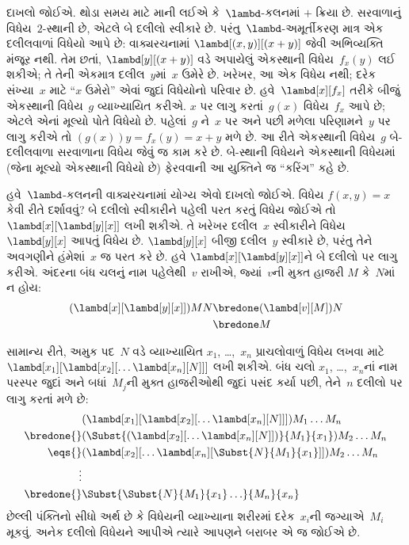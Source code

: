 દાખલો જોઈએ. થોડા સમય માટે માની લઈએ કે~$\lambd$-કલનમાં
$+$ ક્રિયા છે. સરવાળાનું વિધેય~$2$-સ્થાની છે, એટલે બે દલીલો
સ્વીકારે છે. પરંતુ~$\lambd$-અમૂર્તીકરણ માત્ર એક દલીલવાળાં વિધેયો
આપે છે: વાક્યરચનામાં $\lambd[(x,y)][(x+y)]$ જેવી અભિવ્યક્તિ
મંજૂર નથી. તેમ છતાં, $\lambd[y][(x+y)]$ વડે અપાયેલું એકસ્થાની
વિધેય~$f_x(y)$ લઈ શકીએ; તે તેની એકમાત્ર દલીલ~$y$માં~$x$ ઉમેરે
છે. ખરેખર, આ એક વિધેય નથી; દરેક સંખ્યા~$x$ માટે ``$x$ ઉમેરો''
એવાં જુદાં વિધેયોનો પરિવાર છે. હવે~$\lambd[x][f_x]$ તરીકે બીજું
એકસ્થાની વિધેય~$g$ વ્યાખ્યાયિત કરીએ. $x$ પર લાગુ કરતાં~$g(x)$
વિધેય~$f_x$ આપે છે; એટલે એનાં મૂલ્યો પોતે વિધેયો છે. પહેલાં~$g$
ને~$x$ પર અને પછી મળેલા પરિણામને~$y$ પર લાગુ કરીએ તો
$(g(x))y = f_x(y) = x+y$ મળે છે. આ રીતે એકસ્થાની વિધેય~$g$
બે-દલીલવાળા સરવાળાના વિધેય જેવું જ કામ કરે છે. બે-સ્થાની વિધેયને
એકસ્થાની વિધેયમાં (જેના મૂલ્યો એકસ્થાની વિધેયો છે) ફેરવવાની
આ યુક્તિને જ ``કરિંગ'' કહે છે.

હવે~$\lambd$-કલનની વાક્યરચનામાં યોગ્ય એવો દાખલો જોઈએ.
વિધેય $f(x,y) = x$ કેવી રીતે દર્શાવવું? બે દલીલો સ્વીકારીને
પહેલી પરત કરતું વિધેય જોઈએ તો $\lambd[x][\lambd[y][x]]$ લખી
શકીએ. તે ખરેખર દલીલ~$x$ સ્વીકારીને વિધેય~$\lambd[y][x]$
આપતું વિધેય છે. $\lambd[y][x]$ બીજી દલીલ~$y$ સ્વીકારે છે,
પરંતુ તેને અવગણીને હંમેશાં~$x$ જ પરત કરે છે. હવે
$\lambd[x][\lambd[y][x]]$ને બે દલીલો પર લાગુ કરીએ.
અંદરના બંધ ચલનું નામ પહેલેથી~$v$ રાખીએ, જ્યાં~$v$ની મુક્ત હાજરી
$M$ કે~$N$માં ન હોય:
\begin{align*}
  (\lambd[x][\lambd[y][x]])MN
  \bredone & (\lambd[v][M])N \\
  \bredone & M
\end{align*}

સામાન્ય રીતે, અમુક પદ~$N$ વડે વ્યાખ્યાયિત $x_1$, \dots,~$x_n$
પ્રાચલોવાળું વિધેય લખવા માટે
$\lambd[x_1][\lambd[x_2][\ldots\lambd[x_n][N]]]$ લખી શકીએ.
બંધ ચલો $x_1$, \dots,~$x_n$નાં નામ પરસ્પર જુદાં અને બધાં~$M_j$ની
મુક્ત હાજરીઓથી જુદાં પસંદ કર્યા પછી, તેને~$n$ દલીલો પર લાગુ કરતાં મળે છે:
\begin{align*}
  & (\lambd[x_1][\lambd[x_2][\ldots\lambd[x_n][N]]]) M_1 \dots M_n \\
  \bredone {} & (\Subst{(\lambd[x_2][\ldots\lambd[x_n][N]])}{M_1}{x_1}) M_2
  \dots M_n\\
   \eqs {} & (\lambd[x_2][\ldots\lambd[x_n][\Subst{N}{M_1}{x_1}]]) M_2
            \dots M_n \\
  \vdots & \\
  \bredone {} &\Subst{\Subst{N}{M_1}{x_1}\ldots}{M_n}{x_n}
\end{align*}
છેલ્લી પંક્તિનો સીધો અર્થ છે કે વિધેયની વ્યાખ્યાના શરીરમાં
દરેક~$x_i$ની જગ્યાએ~$M_i$ મૂકવું. અનેક દલીલો વિધેયને આપીએ ત્યારે
આપણને બરાબર એ જ જોઈએ છે.
\endgroup


